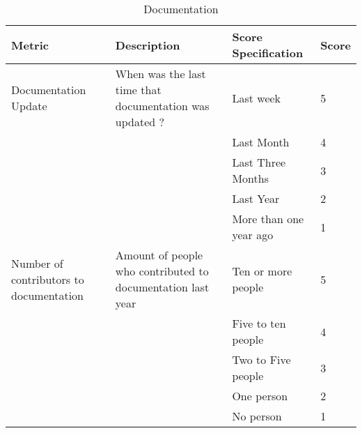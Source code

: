\documentclass[11pt]{article}
\begin{document}
\begin{table}[H]
  \begin{center}
    \begin{tabular}{ | p{3cm} | p{5cm} | p{3cm} | l | }
    \hline
    Metric & Description & Score Specification & Score \\
    \hline
    Documentation Update & When was the last time that documentation was updated ? & Last week & 5 \\ \cline{3-3} \cline{4-4} 
    & & Last Month & 4 \\ \cline{3-3}\cline{4-4}
    & & Last Three Months & 3 \\ \cline{3-3}\cline{4-4}
    & & Last Year & 2 \\ \cline{3-3}\cline{4-4}
    & & More than one year ago & 1 \\ 
    \hline
    Number of contributors to documentation & Amount of people who contributed to documentation last year & Ten or more people & 5 \\ \cline{3-3} \cline{4-4} 
    & & Five to ten people & 4 \\ \cline{3-3}\cline{4-4}
    & & Two to Five people & 3 \\ \cline{3-3}\cline{4-4}
    & & One person & 2 \\ \cline{3-3}\cline{4-4}
    & & No person & 1 \\ 
    \hline
    \end{tabular}
    \caption{Documentation}
    \label{tab:documentation}
  \end{center}
\end{table}
\end{document}
